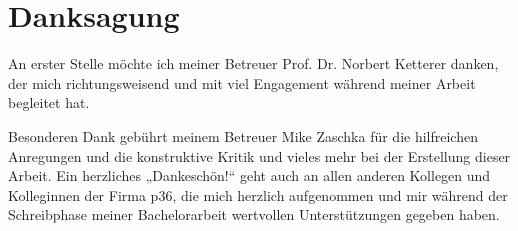 
\chapter*{Danksagung}

An erster Stelle möchte ich meiner Betreuer Prof. Dr. Norbert Ketterer danken, der mich richtungsweisend und mit viel Engagement während meiner Arbeit begleitet hat.
 
Besonderen Dank gebührt meinem Betreuer Mike Zaschka für die hilfreichen Anregungen und die konstruktive Kritik und vieles mehr bei der Erstellung dieser Arbeit. Ein herzliches „Dankeschön!“ geht auch an allen anderen Kollegen und Kolleginnen der Firma p36, die mich herzlich aufgenommen und mir während der Schreibphase meiner Bachelorarbeit wertvollen Unterstützungen gegeben haben. 



